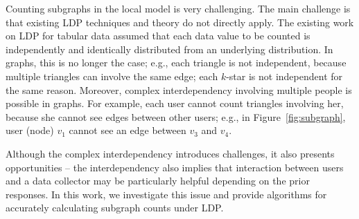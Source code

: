 Counting subgraphs in the local model is very challenging. 
The main challenge is that existing LDP techniques and theory do not directly apply. 
The existing work on LDP for tabular data assumed that 
each data value to be counted 
is independently and identically distributed from an underlying distribution. 
In graphs, this is no longer the case; e.g., 
each triangle is not independent, because multiple triangles can involve the same edge; 
each $k$-star is not independent for the same reason. 
Moreover, complex interdependency involving multiple people is possible in graphs. 
For example, each user cannot count triangles involving her, because she cannot see edges between other users; 
e.g., in Figure~\ref{fig:subgraph}, user (node) $v_1$ cannot see an edge between $v_3$ and $v_4$. 

Although the complex interdependency introduces challenges, it also presents opportunities -- the interdependency also implies that interaction between users and a data collector may be particularly helpful depending on the prior responses. 
In this work, we investigate this issue and provide algorithms for accurately calculating subgraph counts under LDP. 

